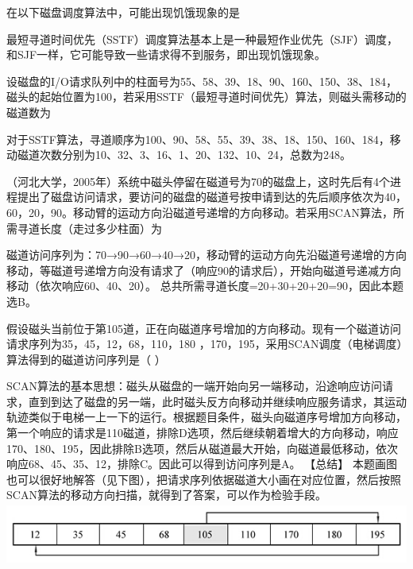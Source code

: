 \question 在以下磁盘调度算法中，可能出现饥饿现象的是
\par{}
\begin{solution}最短寻道时间优先（SSTF）调度算法基本上是一种最短作业优先（SJF）调度，和SJF一样，它可能导致一些请求得不到服务，即出现饥饿现象。
\end{solution}
\question 设磁盘的I/O请求队列中的柱面号为55、58、39、18、90、160、150、38、184，磁头的起始位置为100，若采用SSTF（最短寻道时间优先）算法，则磁头需移动的磁道数为
\par{}
\begin{solution}对于SSTF算法，寻道顺序为100、90、58、55、39、38、18、150、160、184，移动磁道次数分别为10、32、3、16、1、20、132、10、24，总数为248。
\end{solution}
\question （河北大学，2005年）系统中磁头停留在磁道号为70的磁盘上，这时先后有4个进程提出了磁盘访问请求，要访问的磁盘的磁道号按申请到达的先后顺序依次为40，60，20，90。移动臂的运动方向沿磁道号递增的方向移动。若采用SCAN算法，所需寻道长度（走过多少柱面）为
\par{}
\begin{solution}磁道访问序列为：70→90→60→40→20，移动臂的运动方向先沿磁道号递增的方向移动，等磁道号递增方向没有请求了（响应90的请求后），开始向磁道号递减方向移动（依次响应60、40、20）。
总共所需寻道长度=20+30+20+20=90，因此本题选B。
\end{solution}
\question 假设磁头当前位于第105道，正在向磁道序号增加的方向移动。现有一个磁道访问请求序列为35，45，12，68，110，180
，170，195，采用SCAN调度（电梯调度）算法得到的磁道访问序列是（ ）
\par{}
\begin{solution}SCAN算法的基本思想：磁头从磁盘的一端开始向另一端移动，沿途响应访问请求，直到到达了磁盘的另一端，此时磁头反方向移动并继续响应服务请求，其运动轨迹类似于电梯一上一下的运行。根据题目条件，磁头向磁道序号增加方向移动，第一个响应的请求是110磁道，排除D选项，然后继续朝着增大的方向移动，响应170、180、195，因此排除B选项，然后从磁道最大开始，向磁道最低移动，依次响应68、45、35、12，排除C。因此可以得到访问序列是A。
【总结】
本题画图也可以很好地解答（见下图），把请求序列依据磁道大小画在对应位置，然后按照SCAN算法的移动方向扫描，就得到了答案，可以作为检验手段。
\includegraphics[width=5.73958in,height=0.81250in]{computerassets/8b7f43b8e182f4cc4665922fbe7c606c.jpeg}
\end{solution}
